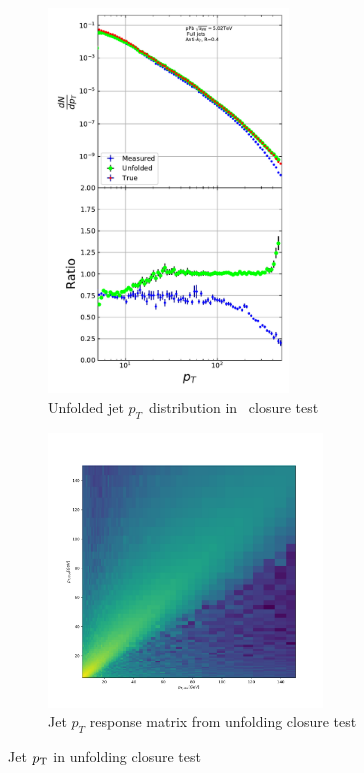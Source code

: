  \begin{figure}
\begin{subfigure}[b]{0.5\textwidth}
\includegraphics[width=0.7\textwidth]{figures/analysis/JetPtUnfolded.pdf}
\caption{Unfolded jet $p_T$ distribution in \pythia~closure test}
\label{fig:jetptunf}
\end{subfigure}
\begin{subfigure}[b]{0.5\textwidth}
\includegraphics[width=0.8\textwidth]{figures/analysis/JetPtResponse.pdf} 
\caption{Jet $p_T$ response matrix from unfolding closure test}
\label{fig:jetptresponse}
\end{subfigure}
\caption{Jet $p_{\rm T}$ in unfolding closure test}
\label{fig:jetptclosure}
\end{figure}
 
